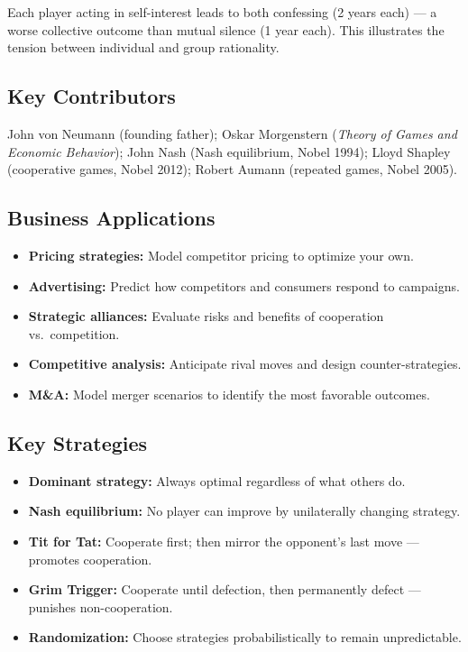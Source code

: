 \documentclass[11pt, letterpaper]{article}
\begin{document}
Each player acting in self-interest leads to both confessing (2 years each) --- a worse collective outcome than mutual silence (1 year each). This illustrates the tension between individual and group rationality.

\subsection{Key Contributors}

John von Neumann (founding father); Oskar Morgenstern (\textit{Theory of Games and Economic Behavior}); John Nash (Nash equilibrium, Nobel 1994); Lloyd Shapley (cooperative games, Nobel 2012); Robert Aumann (repeated games, Nobel 2005).

\subsection{Business Applications}

\begin{itemize}[leftmargin=*]
  \item \textbf{Pricing strategies:} Model competitor pricing to optimize your own.
  \item \textbf{Advertising:} Predict how competitors and consumers respond to campaigns.
  \item \textbf{Strategic alliances:} Evaluate risks and benefits of cooperation vs.\ competition.
  \item \textbf{Competitive analysis:} Anticipate rival moves and design counter-strategies.
  \item \textbf{M\&A:} Model merger scenarios to identify the most favorable outcomes.
\end{itemize}

\subsection{Key Strategies}

\begin{itemize}[leftmargin=*]
  \item \textbf{Dominant strategy:} Always optimal regardless of what others do.
  \item \textbf{Nash equilibrium:} No player can improve by unilaterally changing strategy.
  \item \textbf{Tit for Tat:} Cooperate first; then mirror the opponent's last move --- promotes cooperation.
  \item \textbf{Grim Trigger:} Cooperate until defection, then permanently defect --- punishes non-cooperation.
  \item \textbf{Randomization:} Choose strategies probabilistically to remain unpredictable.
\end{itemize}
\end{document}
